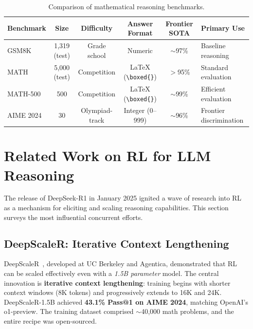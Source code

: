 \documentclass[12pt,a4paper]{report}
\begin{document}
\begin{table}[ht]
\centering
\caption{Comparison of mathematical reasoning benchmarks.}
\label{tab:math-benchmarks}
\small
\begin{tabular}{lccccl}
\toprule
\textbf{Benchmark} & \textbf{Size} & \textbf{Difficulty} & \textbf{Answer Format} & \textbf{Frontier SOTA} & \textbf{Primary Use} \\
\midrule
GSM8K & 1,319 (test) & Grade school & Numeric & $\sim$97\% & Baseline reasoning \\
MATH & 5,000 (test) & Competition & \LaTeX{} (\verb|\boxed{}|) & $>$95\% & Standard evaluation \\
MATH-500 & 500 & Competition & \LaTeX{} (\verb|\boxed{}|) & $\sim$99\% & Efficient evaluation \\
AIME 2024 & 30 & Olympiad-track & Integer (0--999) & $\sim$96\% & Frontier discrimination \\
\bottomrule
\end{tabular}
\end{table}


\section{Related Work on RL for LLM Reasoning}
\label{sec:related-work-rl-reasoning}

The release of DeepSeek-R1 in January 2025 ignited a wave of research into RL as a mechanism for eliciting and scaling reasoning capabilities. This section surveys the most influential concurrent efforts.

\subsection{DeepScaleR: Iterative Context Lengthening}

DeepScaleR~\cite{luo2025deepscaler}, developed at UC Berkeley and Agentica, demonstrated that RL can be scaled effectively even with a \emph{1.5B parameter} model. The central innovation is \textbf{iterative context lengthening}: training begins with shorter context windows (8K tokens) and progressively extends to 16K and 24K. DeepScaleR-1.5B achieved \textbf{43.1\% Pass@1 on AIME 2024}, matching OpenAI's o1-preview. The training dataset comprised $\sim$40,000 math problems, and the entire recipe was open-sourced.
\end{document}
